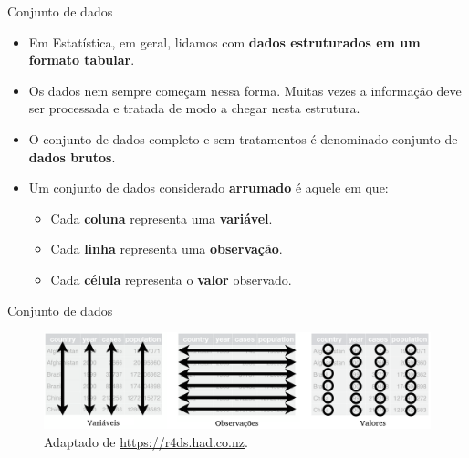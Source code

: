 \documentclass[
  ignorenonframetext,
  serif,
  professionalfont,
  usenames,
  dvipsnames,
  aspectratio = 169]{beamer}
\providecommand{\tightlist}{%
  \setlength{\itemsep}{0pt}\setlength{\parskip}{0pt}}
\renewcommand{\tightlist}{%
  \setlength{\itemsep}{0\baselineskip}
  \setlength{\parskip}{0.25\baselineskip}
}
\begin{document}
\begin{frame}{Conjunto de dados}
\label{conjunto-de-dados}
\begin{itemize}
\item
  Em Estatística, em geral, lidamos com
  \textbf{dados estruturados em um formato tabular}.
\item
  Os dados nem sempre começam nessa forma. Muitas vezes a informação
  deve ser processada e tratada de modo a chegar nesta estrutura.
\item
  O conjunto de dados completo e sem tratamentos é denominado conjunto
  de \textbf{dados brutos}.
\end{itemize}

\vspace{0.3cm}

\begin{itemize}
\tightlist
\item
  Um conjunto de dados considerado \textbf{arrumado} é aquele em que:

  \begin{itemize}
  \tightlist
  \item
    Cada \textbf{coluna} representa uma \textbf{variável}.
  \item
    Cada \textbf{linha} representa uma \textbf{observação}.
  \item
    Cada \textbf{célula} representa o \textbf{valor} observado.
  \end{itemize}
\end{itemize}
\end{frame}

\begin{frame}{Conjunto de dados}
\label{conjunto-de-dados-1}
\begin{figure}

{\centering \includegraphics[width=0.9\linewidth]{./img/tidy-data} 

}

\caption{Adaptado de \href{https://r4ds.had.co.nz/tidy-data.html}{https://r4ds.had.co.nz}.}\label{fig:unnamed-chunk-23}
\end{figure}
\end{frame}
\end{document}
